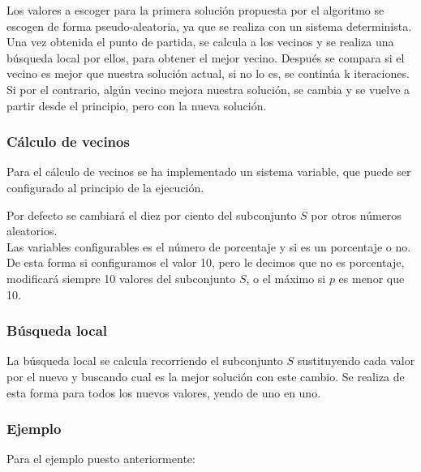 Los valores a escoger para la primera solución propuesta por el algoritmo se escogen de forma pseudo-aleatoria, ya que se realiza con un sistema determinista.\\

Una vez obtenida el punto de partida, se calcula a los vecinos y se realiza una búsqueda local por ellos, para obtener el mejor vecino. Después se compara si el vecino es mejor que nuestra solución actual, si no lo es, se continúa k iteraciones. Si por el contrario, algún vecino mejora nuestra solución, se cambia y se vuelve a partir desde el principio, pero con la nueva solución.\\

\subsubsection{Cálculo de vecinos}
Para el cálculo de vecinos se ha implementado un sistema variable, que puede ser configurado al principio de la ejecución.

Por defecto se cambiará el diez por ciento del subconjunto $S$ por otros números aleatorios. \\

Las variables configurables es el número de porcentaje y si es un porcentaje o no. De esta forma si configuramos el valor 10, pero le decimos que no es porcentaje, modificará siempre 10 valores del subconjunto $S$, o el máximo si $p$ es menor que 10.

\subsubsection{Búsqueda local}
La búsqueda local se calcula recorriendo el subconjunto $S$ sustituyendo cada valor por el nuevo y buscando cual es la mejor solución con este cambio. Se realiza de esta forma para todos los nuevos valores, yendo de uno en uno.

\subsubsection{Ejemplo}
Para el ejemplo puesto anteriormente:

